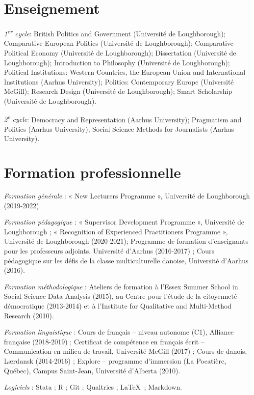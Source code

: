\documentclass[letterpaper,fontsize=10.5pt]{scrartcl}
\begin{document}
\section{Enseignement}
{}\textit{1\textsuperscript{er} cycle}: British Politics and Government (Université de Loughborough); Comparative European Politics (Université de Loughborough); Comparative Political Economy (Université de Loughborough); Dissertation (Université de Loughborough); Introduction to Philosophy (Université de Loughborough); Political Institutions: Western Countries, the European Union and International Institutions (Aarhus University); Politics: Contemporary Europe (Université McGill); Research Design (Université de Loughborough); Smart Scholarship (Université de Loughborough).\\
\hfill \break
{}
{}\textit{2\textsuperscript{e} cycle}: Democracy and Representation (Aarhus University); Pragmatism and Politics (Aarhus University); Social Science Methods for Journalists (Aarhus University).

\section{Formation professionnelle}
{}\textit{Formation générale} : « New Lecturers Programme », Université de Loughborough (2019-2022).\\
\hfill \break
{}
{}\textit{Formation pédagogique} : « Supervisor Development Programme », Université de Loughborough ; « Recognition of Experienced Practitioners Programme », Université de Loughborough (2020-2021); Programme de formation d'enseignants pour les professeurs adjoints, Université d'Aarhus (2016-2017) ; Cours pédagogique sur les défis de la classe multiculturelle danoise, Université d'Aarhus (2016).\\
\hfill \break
{}
{}\textit{Formation méthodologique} : Ateliers de formation à l'Essex Summer School in Social Science Data Analysis (2015), au Centre pour l’étude de la citoyenneté démocratique (2013-2014) et	à l'Institute for Qualitative and Multi-Method Research (2010).\\
\hfill \break
{}
{}\textit{Formation linguistique} : Cours de français – niveau autonome (C1), Alliance française (2018-2019) ; Certificat de compétence en français écrit – Communication en milieu de travail, Université McGill (2017) ; Cours de danois, Lærdansk (2014-2016) ; Explore – programme d'immersion (La Pocatière, Québec), Campus Saint-Jean, Université d'Alberta (2010).\\
\hfill \break
{}
{}\textit{Logiciels} : Stata ; R ; Git ; Qualtrics ; \LaTeX\ ; Markdown.
\end{document}
